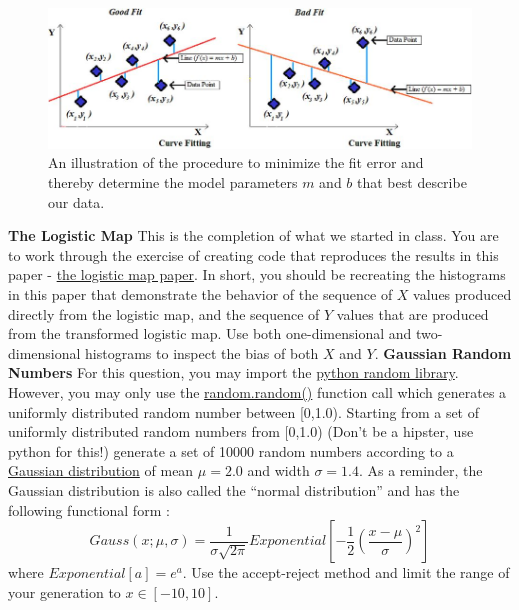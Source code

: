 \documentclass[12pt]{article}
\begin{document}
\begin{figure}[h!]
  \center
  \includegraphics[width=0.7\linewidth]{fit}
  \caption{An illustration of the procedure to minimize the fit error and thereby determine the model parameters $m$ and $b$ that best describe our data.}
  \label{fig:fit}
\end{figure}

\newpage
\textbf{The Logistic Map} 
\newline
This is the completion of what we started in class.  You are to work through the exercise of creating code that reproduces the results in this paper - \href{http://dtic.mil/dtic/tr/fulltext/u2/a282268.pdf}{the logistic map paper}.  In short, you should be recreating the histograms in this paper that demonstrate the behavior of the sequence of $X$ values produced directly from the logistic map, and the sequence of $Y$ values that are produced from the transformed logistic map.  Use both one-dimensional and two-dimensional histograms to inspect the bias of both $X$ and $Y$. 
\newline
\newline
\textbf{Gaussian Random Numbers} 
\newline
For this question, you may import the \href{https://docs.python.org/2/library/random.html}{python random library}.  However, you may only use the \href{https://docs.python.org/2/library/random.html#random.random}{random.random()} function call which generates a uniformly distributed random number between [0,1.0).
\newline
\newline
Starting from a set of uniformly distributed random numbers from [0,1.0) (Don't be a hipster, use python for this!) generate a set of 10000 random numbers according to a \href{https://en.wikipedia.org/wiki/Gaussian_function}{Gaussian distribution} of mean $\mu=2.0$ and width $\sigma=1.4$.  As a reminder, the Gaussian distribution is also called the ``normal distribution'' and has the following functional form :
\begin{displaymath}
 Gauss(x;\mu,\sigma)=\frac{1}{\sigma\sqrt{2\pi}}Exponential[-\frac{1}{2} (\frac{x-\mu}{\sigma})^{2}]
\end{displaymath}
where $Exponential[a]=e^{a}$.  Use the accept-reject method and limit the range of your generation to $x\in [-10,10]$.
\end{document}

